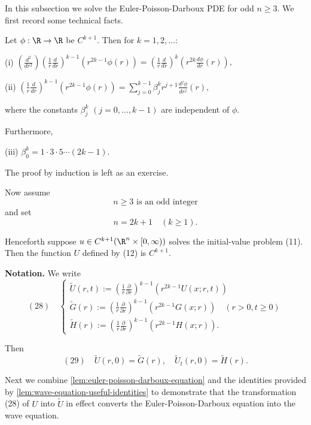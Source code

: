In this subsection we solve the Euler-Poisson-Darboux PDE for odd $n \geq 3$. We first record some technical facts.

\begin{lemma}
\label{lem:wave-equation-useful-identities}
Let $\phi : \R \to \R$ be $C^{k+1}$. Then for $k = 1,2,\ldots$:

(i) $\left(\frac{d^2}{dr^2}\right)\left(\frac{1}{r}\frac{d}{dr}\right)^{k-1}\left(r^{2k-1}\phi(r)\right) = \left(\frac{1}{r}\frac{d}{dr}\right)^k\left(r^{2k}\frac{d\phi}{dr}(r)\right),$

(ii) $\left(\frac{1}{r}\frac{d}{dr}\right)^{k-1}\left(r^{2k-1}\phi(r)\right) = \sum_{j=0}^{k-1}\beta_j^k r^{j+1} \frac{d^j\phi}{dr^j}(r),$

where the constants $\beta_j^k$ $(j = 0, \ldots, k-1)$ are independent of $\phi$.

Furthermore,

(iii) $\beta_0^k = 1 \cdot 3 \cdot 5 \cdots (2k-1)$.
\end{lemma}

The proof by induction is left as an exercise.

Now assume
$$n \geq 3 \text{ is an odd integer}$$
and set
$$n = 2k + 1 \quad (k \geq 1).$$

Henceforth suppose $u \in C^{k+1}(\R^n \times [0, \infty))$ solves the initial-value problem (11). Then the function $U$ defined by (12) is $C^{k+1}$.

\textbf{Notation.} We write
$$(28) \quad \left\{\begin{array}{l}
\tilde{U}(r,t) := \left(\frac{1}{r}\frac{\partial}{\partial r}\right)^{k-1}(r^{2k-1}U(x;r,t)) \\
\tilde{G}(r) := \left(\frac{1}{r}\frac{\partial}{\partial r}\right)^{k-1}(r^{2k-1}G(x;r)) \quad (r > 0, t \geq 0) \\
\tilde{H}(r) := \left(\frac{1}{r}\frac{\partial}{\partial r}\right)^{k-1}(r^{2k-1}H(x;r)).
\end{array}\right.$$

Then
$$(29) \quad \tilde{U}(r,0) = \tilde{G}(r), \quad \tilde{U}_t(r,0) = \tilde{H}(r).$$

Next we combine \cref{lem:euler-poisson-darboux-equation} and the identities provided by \cref{lem:wave-equation-useful-identities} to demonstrate that the transformation (28) of $U$ into $\tilde{U}$ in effect converts the Euler-Poisson-Darboux equation into the wave equation.

